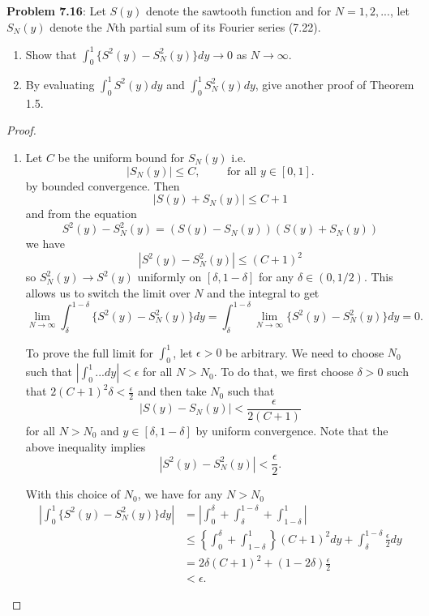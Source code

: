 \documentclass[12pt]{article}
\begin{document}
\fi

\textbf{Problem 7.16}: Let $S(y)$ denote the sawtooth function and for $N = 1, 2, ...$, let $S_N(y)$ denote the $N$th partial sum of its Fourier series (7.22).
\begin{enumerate}
\item Show that $\int_0^1 \{S^2(y) - S_N^2(y)\} dy \rightarrow 0$ as $N \rightarrow \infty$.
\item By evaluating $\int_0^1 S^2(y) dy$ and $\int_0^1 S_N^2(y) dy$, give another proof of Theorem 1.5.
\end{enumerate}

\begin{proof}
\begin{enumerate}
\item Let $C$ be the uniform bound for $S_N(y)$ i.e.
$$|S_N(y)| \leq C, \qquad \text{ for all } y \in [0, 1].$$
by bounded convergence. Then
$$|S(y) + S_N(y)| \leq C + 1$$
and from the equation
$$S^2(y) - S_N^2(y) = (S(y) - S_N(y))(S(y) + S_N(y))$$
we have
$$|S^2(y) - S_N^2(y)| \leq (C + 1)^2$$
so $S_N^2(y) \rightarrow S^2(y)$ uniformly on $[\delta, 1 - \delta]$ for any $\delta \in (0, 1/2)$. This allows us to switch the limit over $N$ and the integral to get
$$\lim_{N \rightarrow \infty} \int_\delta^{1-\delta} \{S^2(y) - S_N^2(y)\} dy = \int_\delta^{1-\delta} \lim_{N \rightarrow \infty} \{S^2(y) - S_N^2(y)\} dy = 0.$$

To prove the full limit for $\int_0^1$, let $\epsilon > 0$ be arbitrary. We need to choose $N_0$ such that $|\int_0^1 ... dy| < \epsilon$ for all $N > N_0$. To do that, we first choose $\delta > 0$ such that $2 (C + 1)^2 \delta < \frac{\epsilon}{2}$ and then take $N_0$ such that
$$|S(y) - S_N(y)| < \frac{\epsilon}{2 (C + 1)}$$ 
for all $N > N_0$ and $y \in [\delta, 1-\delta]$ by uniform convergence. Note that the above inequality implies
$$|S^2(y) - S_N^2(y)| < \frac{\epsilon}{2}.$$

With this choice of $N_0$, we have for any $N > N_0$
\begin{align*}
|\int_0^1 \{S^2(y) - S_N^2(y)\} dy| &= |\int_0^\delta + \int_\delta^{1-\delta} + \int_{1-\delta}^1|\\
&\leq \left\{ \int_0^\delta + \int_{1-\delta}^1 \right\} (C + 1)^2 dy + \int_\delta^{1-\delta} \frac{\epsilon}{2} dy\\
&= 2\delta(C+1)^2 + (1 - 2\delta) \frac{\epsilon}{2}\\
&< \epsilon.
\end{align*}


\end{enumerate}
\end{proof}
\end{document}
